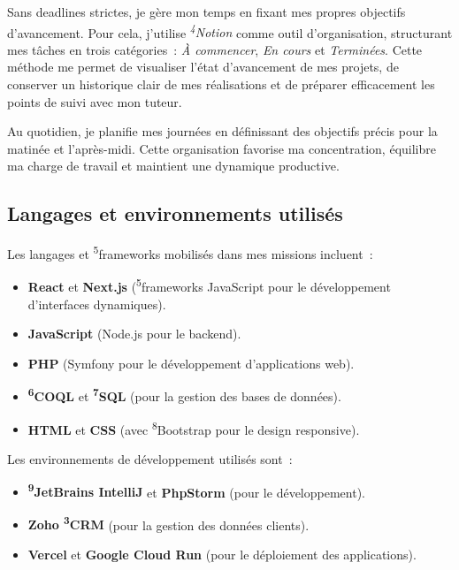 Sans deadlines strictes, je gère mon temps en fixant mes propres objectifs d’avancement. Pour cela, j’utilise \textit{\textsuperscript{4}Notion} comme outil d’organisation, structurant mes tâches en trois catégories~: \textit{À commencer}, \textit{En cours} et \textit{Terminées}. Cette méthode me permet de visualiser l’état d’avancement de mes projets, de conserver un historique clair de mes réalisations et de préparer efficacement les points de suivi avec mon tuteur.

Au quotidien, je planifie mes journées en définissant des objectifs précis pour la matinée et l’après-midi. Cette organisation favorise ma concentration, équilibre ma charge de travail et maintient une dynamique productive.

\subsection{Langages et environnements utilisés}

Les langages et \textsuperscript{5}frameworks mobilisés dans mes missions incluent~:\vspace{0.3cm}

\begin{itemize}
    \item \textbf{React} et \textbf{Next.js} (\textsuperscript{5}frameworks JavaScript pour le développement d’interfaces dynamiques).\vspace{0.3cm}
    \item \textbf{JavaScript} (Node.js pour le backend).\vspace{0.3cm}
    \item \textbf{PHP} (Symfony pour le développement d’applications web).\vspace{0.3cm}
    \item \textbf{\textsuperscript{6}COQL} et \textbf{\textsuperscript{7}SQL} (pour la gestion des bases de données).\vspace{0.3cm}
    \item \textbf{HTML} et \textbf{CSS} (avec \textsuperscript{8}Bootstrap pour le design responsive).\vspace{0.3cm}
\end{itemize}

Les environnements de développement utilisés sont~:\vspace{0.3cm}

\begin{itemize}
    \item \textbf{\textsuperscript{9}JetBrains IntelliJ} et \textbf{PhpStorm} (pour le développement).\vspace{0.3cm}
    \item \textbf{Zoho \textsuperscript{3}CRM} (pour la gestion des données clients).\vspace{0.3cm}
    \item \textbf{Vercel} et \textbf{Google Cloud Run} (pour le déploiement des applications).\vspace{0.3cm}
\end{itemize}

